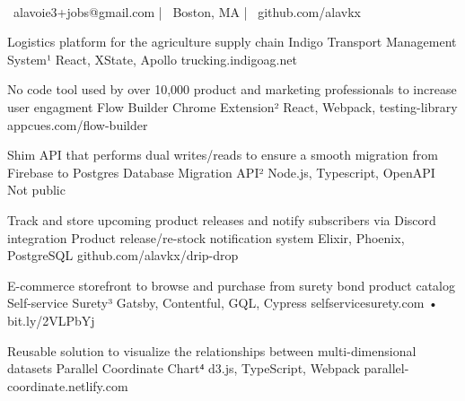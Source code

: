 \documentclass[]{awesome-cv}
\begin{document}
    
\begin{center}
	  \\
	\vspace{2mm}
	{\faEnvelope\ alavoie3+jobs@gmail.com} | {\faMapMarker\ Boston, MA} | {\faLink\ github.com/alavkx}
\end{center}

\begin{cventries}
	\cventry
	{Logistics platform for the agriculture supply chain}
	{Indigo Transport Management System¹}
	{React, XState, Apollo}
	{trucking.indigoag.net}
	{}
	
	\vspace{-6mm}
	\cventry
	{No code tool used by over 10,000 product and marketing professionals to increase user engagment}
	{Flow Builder Chrome Extension²}
	{React, Webpack, testing-library}
	{appcues.com/flow-builder}
	{}
	
	\vspace{-6mm}
	\cventry
	{Shim API that performs dual writes/reads to ensure a smooth migration from Firebase to Postgres}
	{Database Migration API²}
	{Node.js, Typescript, OpenAPI}
	{Not public}
	{}
	
	\vspace{-6mm}
	\cventry
	{Track and store upcoming product releases and notify subscribers via Discord integration}
	{Product release/re-stock notification system}
	{Elixir, Phoenix, PostgreSQL}
	{github.com/alavkx/drip-drop}
	{}
	
	\vspace{-6mm}
	\cventry
	{E-commerce storefront to browse and purchase from surety bond product catalog}
	{Self-service Surety³}
	{Gatsby, Contentful, GQL, Cypress}
	{selfservicesurety.com • bit.ly/2VLPbYj}
	{}

	\vspace{-6mm}
	\cventry
	{Reusable solution to visualize the relationships between multi-dimensional datasets}
	{Parallel Coordinate Chart⁴}
	{d3.js, TypeScript, Webpack}
	{parallel-coordinate.netlify.com}
	{}
	
	\vspace{-6mm}
\end{cventries}
\end{document}
